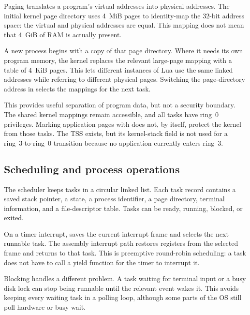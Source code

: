 \documentclass[11pt,a4paper]{scrartcl}
\newcommand{\code}[1]{\texttt{\detokenize{#1}}}
\begin{document}
Paging translates a program's virtual addresses into physical addresses.
The initial kernel page directory uses 4~MiB pages to identity-map the
32-bit address space: the virtual and physical addresses are equal.
This mapping does not mean that 4~GiB of RAM is actually present.

A new process begins with a copy of that page directory. Where it needs
its own program memory, the kernel replaces the relevant large-page
mapping with a table of 4~KiB pages. This lets different instances of Lua
use the same linked addresses while referring to different physical pages.
Switching the page-directory address in \code{CR3} selects the mappings
for the next task.

This provides useful separation of program data, but not a security
boundary. The shared kernel mappings remain accessible, and all tasks
have ring~0 privileges. Marking application pages with \code{PAGE_USER}
does not, by itself, protect the kernel from those tasks. The TSS exists,
but its kernel-stack field is not used for a ring~3-to-ring~0 transition
because no application currently enters ring~3.

\subsection{Scheduling and process operations}
\label{sec:scheduler}

The scheduler keeps tasks in a circular linked list. Each task record
contains a saved stack pointer, a state, a process identifier, a page
directory, terminal information, and a file-descriptor table. Tasks can
be ready, running, blocked, or exited.

On a timer interrupt, \code{scheduler_tick} saves the current interrupt
frame and selects the next runnable task. The assembly interrupt path
restores registers from the selected frame and returns to that task.
This is preemptive round-robin scheduling: a task does not have to call a
yield function for the timer to interrupt it.

Blocking handles a different problem. A task waiting for terminal input
or a busy disk lock can stop being runnable until the relevant event
wakes it. This avoids keeping every waiting task in a polling loop,
although some parts of the OS still poll hardware or busy-wait.
\end{document}
